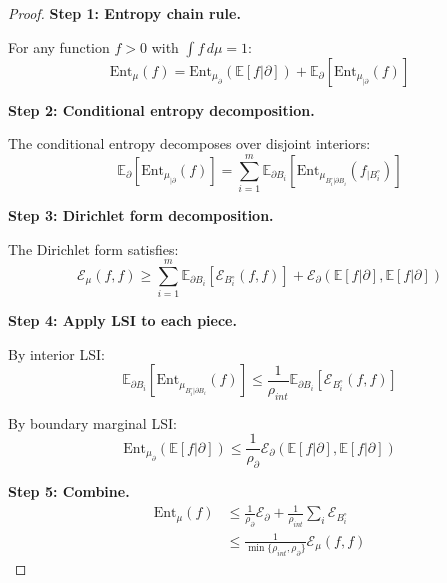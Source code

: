 \begin{proof}
\textbf{Step 1: Entropy chain rule.}

For any function $f > 0$ with $\int f \, d\mu = 1$:
\begin{equation}
\mathrm{Ent}_\mu(f) = \mathrm{Ent}_{\mu_{\partial}}(\mathbb{E}[f | \partial]) + \mathbb{E}_{\partial}\left[\mathrm{Ent}_{\mu_{|\partial}}(f)\right]
\end{equation}

\textbf{Step 2: Conditional entropy decomposition.}

The conditional entropy decomposes over disjoint interiors:
\begin{equation}
\mathbb{E}_{\partial}\left[\mathrm{Ent}_{\mu_{|\partial}}(f)\right] = \sum_{i=1}^m \mathbb{E}_{\partial B_i}\left[\mathrm{Ent}_{\mu_{B_i^\circ | \partial B_i}}(f_{|B_i^\circ})\right]
\end{equation}

\textbf{Step 3: Dirichlet form decomposition.}

The Dirichlet form satisfies:
\begin{equation}
\mathcal{E}_\mu(f, f) \geq \sum_{i=1}^m \mathbb{E}_{\partial B_i}\left[\mathcal{E}_{B_i^\circ}(f, f)\right] + \mathcal{E}_{\partial}(\mathbb{E}[f|\partial], \mathbb{E}[f|\partial])
\end{equation}

\textbf{Step 4: Apply LSI to each piece.}

By interior LSI:
\begin{equation}
\mathbb{E}_{\partial B_i}\left[\mathrm{Ent}_{\mu_{B_i^\circ | \partial B_i}}(f)\right] \leq \frac{1}{\rho_{int}} \mathbb{E}_{\partial B_i}\left[\mathcal{E}_{B_i^\circ}(f, f)\right]
\end{equation}

By boundary marginal LSI:
\begin{equation}
\mathrm{Ent}_{\mu_{\partial}}(\mathbb{E}[f | \partial]) \leq \frac{1}{\rho_{\partial}} \mathcal{E}_{\partial}(\mathbb{E}[f|\partial], \mathbb{E}[f|\partial])
\end{equation}

\textbf{Step 5: Combine.}
\begin{align}
\mathrm{Ent}_\mu(f) &\leq \frac{1}{\rho_{\partial}} \mathcal{E}_\partial + \frac{1}{\rho_{int}} \sum_i \mathcal{E}_{B_i^\circ} \\
&\leq \frac{1}{\min\{\rho_{int}, \rho_{\partial}\}} \mathcal{E}_\mu(f, f)
\end{align}
\end{proof}

